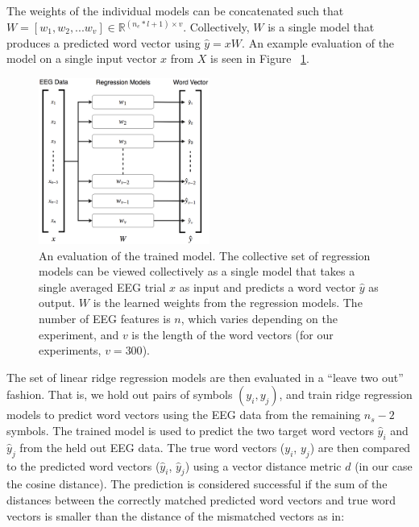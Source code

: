   The weights of the individual models can be concatenated such that $W = [ w_1, w_2, ... w_v ] \in \mathbb{R}^{(n_e * l + 1) \times v}$. Collectively, $W$ is a single model that produces a predicted word vector using $\hat{y} = xW$. An example evaluation of the model on a single input vector $x$ from $X$ is seen in Figure ~\ref{fig:features}.

  \begin{figure}[t]
    \centering
    \includegraphics[width=0.5\textwidth]{figures/features}
    \caption{An evaluation of the trained model. The collective set of regression models can be viewed collectively as a single model that takes a single averaged EEG trial $x$ as input and predicts a word vector $\hat{y}$ as output. $W$ is the learned weights from the regression models. The number of EEG features is $n$, which varies depending on the experiment, and $v$ is the length of the word vectors (for our experiments, $v=300$).}
    \label{fig:features}
  \end{figure}

  The set of linear ridge regression models are then evaluated in a ``leave two out'' fashion. That is, we hold out pairs of symbols $(y_i, y_j)$, and train ridge regression models to predict word vectors using the EEG data from the remaining $n_s-2$ symbols.  The trained model is used to predict the two target word vectors $\hat{y}_i$ and $\hat{y}_j$ from the held out EEG data. The true word vectors ($y_i$, $y_j$) are then compared to the predicted word vectors ($\hat{y}_i$, $\hat{y}_j$) using a vector distance metric $d$ (in our case the cosine distance). The prediction is considered successful if the sum of the distances between the correctly matched predicted word vectors and true word vectors is smaller than the distance of the mismatched vectors as in: 
  
